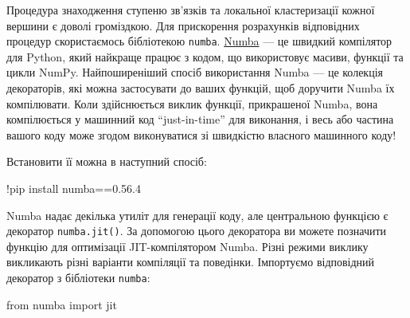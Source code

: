 \documentclass[
  letterpaper,
]{report}
\newenvironment{Shaded}{\begin{snugshade}}{\end{snugshade}}
\newcommand{\FloatTok}[1]{\textcolor[rgb]{0.68,0.00,0.00}{#1}}
\newcommand{\ImportTok}[1]{\textcolor[rgb]{0.00,0.46,0.62}{#1}}
\newcommand{\NormalTok}[1]{\textcolor[rgb]{0.00,0.23,0.31}{#1}}
\newcommand{\OperatorTok}[1]{\textcolor[rgb]{0.37,0.37,0.37}{#1}}
\begin{document}
Процедура знаходження ступеню зв'язків та локальної кластеризації кожної
вершини є доволі громіздкою. Для прискорення розрахунків відповідних
процедур скористаємось бібліотекою \texttt{numba}.
\href{https://numba.readthedocs.io/en/stable/index.html}{Numba} --- це
швидкий компілятор для Python, який найкраще працює з кодом, що
використовує масиви, функції та цикли NumPy. Найпоширеніший спосіб
використання Numba --- це колекція декораторів, які можна застосувати до
ваших функцій, щоб доручити Numba їх компілювати. Коли здійснюється
виклик функції, прикрашеної Numba, вона компілюється у машинний код
``just-in-time'' для виконання, і весь або частина вашого коду може
згодом виконуватися зі швидкістю власного машинного коду!

Встановити її можна в наступний спосіб:

\begin{Shaded}
\begin{Highlighting}[]
\OperatorTok{!}\NormalTok{pip install numba}\OperatorTok{==}\FloatTok{0.56.4}
\end{Highlighting}
\end{Shaded}

Numba надає декілька утиліт для генерації коду, але центральною функцією
є декоратор \texttt{numba.jit()}. За допомогою цього декоратора ви
можете позначити функцію для оптимізації JIT-компілятором Numba. Різні
режими виклику викликають різні варіанти компіляції та поведінки.
Імпортуємо відповідний декоратор з бібліотеки \texttt{numba}:

\begin{Shaded}
\begin{Highlighting}[]
\ImportTok{from}\NormalTok{ numba }\ImportTok{import}\NormalTok{ jit}
\end{Highlighting}
\end{Shaded}
\end{document}
